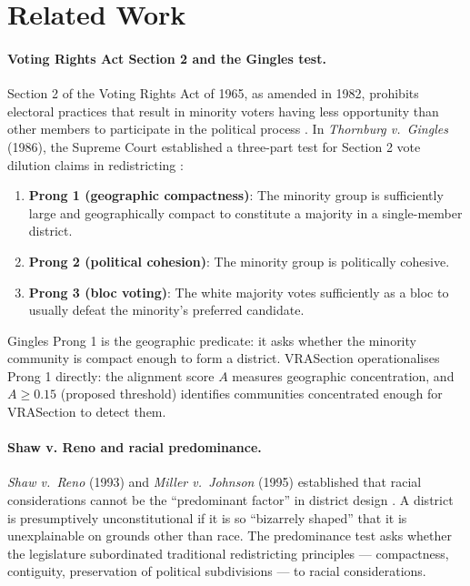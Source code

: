 \section{Related Work}
\label{sec:related}

\paragraph{Voting Rights Act Section 2 and the Gingles test.}
Section 2 of the Voting Rights Act of 1965, as amended in 1982,
prohibits electoral practices that result in minority voters having less
opportunity than other members to participate in the political process
\citep{vra1965}.
In \emph{Thornburg v.\ Gingles} (1986), the Supreme Court established
a three-part test for Section 2 vote dilution claims in redistricting
\citep{gingles1986}:

\begin{enumerate}
\item \textbf{Prong 1 (geographic compactness)}: The minority group is
  sufficiently large and geographically compact to constitute a majority
  in a single-member district.
\item \textbf{Prong 2 (political cohesion)}: The minority group is
  politically cohesive.
\item \textbf{Prong 3 (bloc voting)}: The white majority votes sufficiently
  as a bloc to usually defeat the minority's preferred candidate.
\end{enumerate}

Gingles Prong 1 is the geographic predicate: it asks whether the minority
community is compact enough to form a district.
VRASection operationalises Prong 1 directly: the alignment score $A$ measures
geographic concentration, and $A \geq 0.15$ (proposed threshold)
identifies communities concentrated enough for VRASection to detect them.

\paragraph{Shaw v. Reno and racial predominance.}
\emph{Shaw v.\ Reno} (1993) and \emph{Miller v.\ Johnson} (1995)
established that racial considerations cannot be the ``predominant factor''
in district design \citep{shaw1993,miller1995}.
A district is presumptively unconstitutional if it is so ``bizarrely shaped''
that it is unexplainable on grounds other than race.
The predominance test asks whether the legislature subordinated traditional
redistricting principles --- compactness, contiguity, preservation of
political subdivisions --- to racial considerations.


